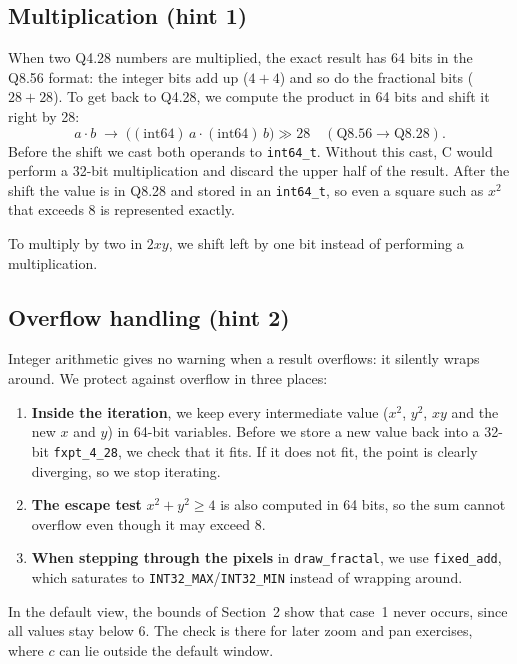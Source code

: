 \documentclass[11pt,a4paper]{article}
\begin{document}
\subsection{Multiplication (hint 1)}

When two Q4.28 numbers are multiplied, the exact result has 64 bits in the
Q8.56 format: the integer bits add up ($4+4$) and so do the fractional bits
($28+28$). To get back to Q4.28, we compute the product in 64 bits and shift
it right by 28:
\[
  a \cdot b \;\longrightarrow\; \bigl((\text{int64})\,a \cdot (\text{int64})\,b\bigr) \gg 28
  \quad (\text{Q8.56} \to \text{Q8.28}).
\]
Before the shift we cast both operands to \texttt{int64\_t}. Without this
cast, C would perform a 32-bit multiplication and discard the upper half of the
result. After the shift the value is in Q8.28 and stored in an
\texttt{int64\_t}, so even a square such as $x^2$ that exceeds 8 is
represented exactly.

To multiply by two in $2xy$, we shift left by one bit instead of performing a
multiplication.

\subsection{Overflow handling (hint 2)}

Integer arithmetic gives no warning when a result overflows: it silently wraps
around. We protect against overflow in three places:
\begin{enumerate}
  \item \textbf{Inside the iteration}, we keep every intermediate value
        ($x^2$, $y^2$, $xy$ and the new $x$ and $y$) in 64-bit variables.
        Before we store a new value back into a 32-bit \texttt{fxpt\_4\_28},
        we check that it fits. If it does not fit, the point is clearly
        diverging, so we stop iterating.
  \item \textbf{The escape test} $x^2 + y^2 \geq 4$ is also computed in
        64 bits, so the sum cannot overflow even though it may exceed 8.
  \item \textbf{When stepping through the pixels} in \texttt{draw\_fractal},
        we use \texttt{fixed\_add}, which saturates to
        \texttt{INT32\_MAX}/\texttt{INT32\_MIN} instead of wrapping around.
\end{enumerate}
In the default view, the bounds of Section~2 show that case~1 never
occurs, since all values stay below 6. The check is there for later zoom and
pan exercises, where $c$ can lie outside the default window.
\end{document}
